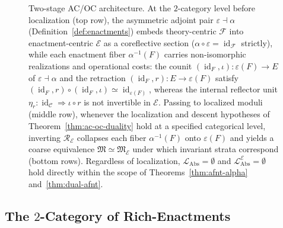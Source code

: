 \documentclass[11pt]{article}
\theoremstyle{plain}
\theoremstyle{definition}
\newcommand{\cF}{\mathcal{F}}
\newcommand{\cC}{\mathcal{C}}
\newcommand{\fM}{\mathfrak{M}}
\newcommand{\LAbs}{\mathcal{L}_{\mathrm{Abs}}}
\newcommand{\cE}{\mathcal{E}}
\newcommand{\fME}{\fM_{\cE}}
\newcommand{\LAbsE}{\LAbs^{\cE}}
\DeclareMathOperator{\id}{id}
\begin{document}
\begin{figure}[ht]
\caption[Two-stage AC/OC theory--realization duality architecture]{Two-stage AC/OC architecture. At the $2$-category level before localization (top row), the asymmetric adjoint pair $\varepsilon \dashv \alpha$ (Definition~\ref{def:enactments}) embeds theory-centric $\cF$ into enactment-centric $\cE$ as a coreflective section ($\alpha \circ \varepsilon = \id_\cF$ strictly), while each enactment fiber $\alpha^{-1}(F)$ carries non-isomorphic realizations and operational costs: the counit $(\id_F, \iota) : \varepsilon(F) \to E$ of $\varepsilon \dashv \alpha$ and the retraction $(\id_F, r) : E \to \varepsilon(F)$ satisfy $(\id_F, r) \circ (\id_F, \iota) \simeq \id_{\varepsilon(F)}$, whereas the internal reflector unit $\eta_r : \id_\cC \Rightarrow \iota \circ r$ is not invertible in $\cE$. Passing to localized moduli (middle row), whenever the localization and descent hypotheses of Theorem~\ref{thm:ac-oc-duality} hold at a specified categorical level, inverting $\mathcal{R}_\cE$ collapses each fiber $\alpha^{-1}(F)$ onto $\varepsilon(F)$ and yields a coarse equivalence $\fM \simeq \fME$ under which invariant strata correspond (bottom rows). Regardless of localization, $\LAbs = \emptyset$ and $\LAbsE = \emptyset$ hold directly within the scope of Theorems~\ref{thm:afnt-alpha} and~\ref{thm:dual-afnt}.}
\label{fig:ac-oc-duality}
\end{figure}

\subsection{\texorpdfstring{The $2$-Category of Rich-Enactments}{The 2-Category of Rich-Enactments}}
\end{document}
